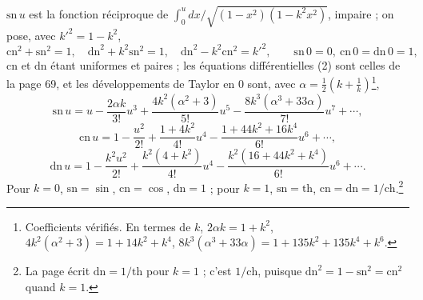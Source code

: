 \documentclass[11pt,a4paper]{article}
\begin{document}
$\mathrm{sn}\,u$
est la fonction réciproque de $\int_0^u dx/\sqrt{(1-x^2)(1-k^2x^2)}$, impaire ;
on pose, avec $k'^2 = 1 - k^2$,
\[
\mathrm{cn}^2 + \mathrm{sn}^2 = 1, \quad \mathrm{dn}^2 + k^2\mathrm{sn}^2 = 1,
\quad \mathrm{dn}^2 - k^2\mathrm{cn}^2 = k'^2, \qquad \mathrm{sn}\,0 = 0,\
\mathrm{cn}\,0 = \mathrm{dn}\,0 = 1, \tag{1}
\]
$\mathrm{cn}$ et $\mathrm{dn}$ étant uniformes et paires ; les équations
différentielles (2) sont celles de la page 69, et les développements de Taylor
en $0$ sont, avec $\alpha = \frac12(k + \frac1k)$\footnote{Coefficients vérifiés. En termes de $k$, $2\alpha k = 1 + k^2$,
$4k^2(\alpha^2 + 3) = 1 + 14k^2 + k^4$, $8k^3(\alpha^3 + 33\alpha) = 1 + 135k^2 +
135k^4 + k^6$.},
\[
\mathrm{sn}\,u = u - \frac{2\alpha k}{3!}u^3 + \frac{4k^2(\alpha^2 +
3)}{5!}u^5 - \frac{8k^3(\alpha^3 + 33\alpha)}{7!}u^7 + \cdots,
\]
\[
\mathrm{cn}\,u = 1 - \frac{u^2}{2!} + \frac{1 + 4k^2}{4!}u^4 - \frac{1 + 44k^2 +
16k^4}{6!}u^6 + \cdots,
\]
\[
\mathrm{dn}\,u = 1 - \frac{k^2u^2}{2!} + \frac{k^2(4 + k^2)}{4!}u^4 -
\frac{k^2(16 + 44k^2 + k^4)}{6!}u^6 + \cdots . \tag{3}
\]
Pour $k = 0$, $\mathrm{sn} = \sin$, $\mathrm{cn} = \cos$,
$\mathrm{dn} = 1$ ; pour $k = 1$, $\mathrm{sn} = \mathrm{th}$, $\mathrm{cn} =
\mathrm{dn} = 1/\mathrm{ch}$.\footnote{La page écrit $\mathrm{dn} =
1/\mathrm{th}$ pour $k = 1$ ; c'est $1/\mathrm{ch}$, puisque $\mathrm{dn}^2 =
1 - \mathrm{sn}^2 = \mathrm{cn}^2$ quand $k = 1$.}
\end{document}
